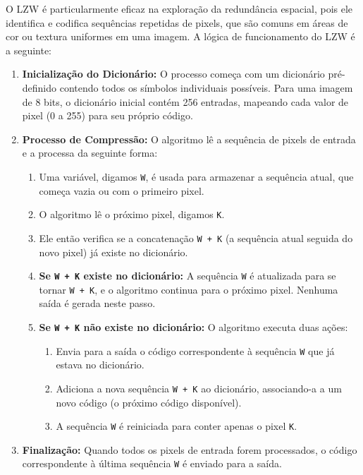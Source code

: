 \documentclass{report}
\begin{document}
O LZW é particularmente eficaz na exploração da redundância espacial, pois ele identifica e codifica sequências repetidas de pixels, que são comuns em áreas de cor ou textura uniformes em uma imagem. A lógica de funcionamento do LZW é a seguinte:

\begin{enumerate}
    \item \textbf{Inicialização do Dicionário:} O processo começa com um dicionário pré-definido contendo todos os símbolos individuais possíveis. Para uma imagem de 8 bits, o dicionário inicial contém 256 entradas, mapeando cada valor de pixel (0 a 255) para seu próprio código.

    \item \textbf{Processo de Compressão:} O algoritmo lê a sequência de pixels de entrada e a processa da seguinte forma:
    \begin{enumerate}
        \item Uma variável, digamos \texttt{W}, é usada para armazenar a sequência atual, que começa vazia ou com o primeiro pixel.
        \item O algoritmo lê o próximo pixel, digamos \texttt{K}.
        \item Ele então verifica se a concatenação \texttt{W + K} (a sequência atual seguida do novo pixel) já existe no dicionário.
        \item \textbf{Se \texttt{W + K} existe no dicionário:} A sequência \texttt{W} é atualizada para se tornar \texttt{W + K}, e o algoritmo continua para o próximo pixel. Nenhuma saída é gerada neste passo.
        \item \textbf{Se \texttt{W + K} não existe no dicionário:} O algoritmo executa duas ações:
            \begin{enumerate}
                \item Envia para a saída o código correspondente à sequência \texttt{W} que já estava no dicionário.
                \item Adiciona a nova sequência \texttt{W + K} ao dicionário, associando-a a um novo código (o próximo código disponível).
                \item A sequência \texttt{W} é reiniciada para conter apenas o pixel \texttt{K}.
            \end{enumerate}
    \end{enumerate}
    
    \item \textbf{Finalização:} Quando todos os pixels de entrada forem processados, o código correspondente à última sequência \texttt{W} é enviado para a saída.
\end{enumerate}
\end{document}
